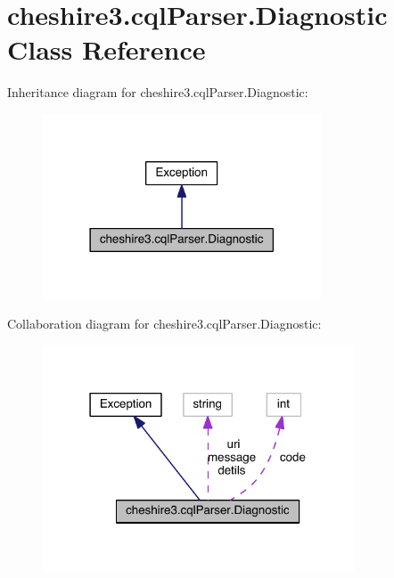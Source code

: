 \hypertarget{classcheshire3_1_1cql_parser_1_1_diagnostic}{\section{cheshire3.\-cql\-Parser.\-Diagnostic Class Reference}
\label{classcheshire3_1_1cql_parser_1_1_diagnostic}
}


Inheritance diagram for cheshire3.\-cql\-Parser.\-Diagnostic\-:
\nopagebreak
\begin{figure}[H]
\begin{center}
\leavevmode
\includegraphics[width=234pt]{classcheshire3_1_1cql_parser_1_1_diagnostic__inherit__graph}
\end{center}
\end{figure}


Collaboration diagram for cheshire3.\-cql\-Parser.\-Diagnostic\-:
\nopagebreak
\begin{figure}[H]
\begin{center}
\leavevmode
\includegraphics[width=262pt]{classcheshire3_1_1cql_parser_1_1_diagnostic__coll__graph}
\end{center}
\end{figure}

